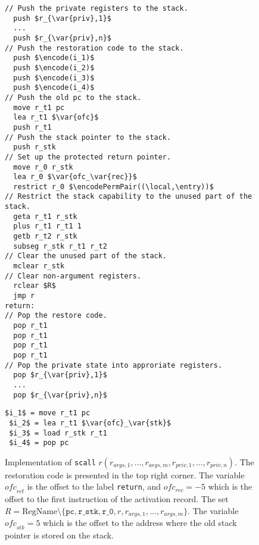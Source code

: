 \documentclass[format=acmsmall, review=true, screen=true]{acmart}
\newcommand{\var}[1]{\mathit{#1}}
\newcommand{\plainfun}[2]{
  \ifthenelse{\equal{#2}{}}
  {\mathit{#1}}
  {\mathit{#1}(#2)}
}
\newcommand{\encode}{\plainfun{encode}{}}
\newcommand{\encodePermPair}{\plainfun{encodePermPair}{}}
\newcommand{\plaindom}[1]{\mathrm{#1}}
\newcommand{\RegName}{\plaindom{RegName}}
\newcommand{\plainperm}[1]{\textsc{#1}}
\newcommand{\entry}{\plainperm{e}}
\newcommand{\plainlocality}[1]{\mathrm{#1}}
\newcommand{\local}{\plainlocality{local}}
\newenvironment{toplas}%
    {\color{OliveGreen}}{}
\begin{document}
\begin{toplas}
\begin{figure}[htb]
  \begin{toplas}
    \centering
    \begin{minipage}[t]{.6\linewidth}
\begin{lstlisting}
// Push the private registers to the stack.
  push $r_{\var{priv},1}$
  ...
  push $r_{\var{priv},n}$
// Push the restoration code to the stack.
  push $\encode(i_1)$
  push $\encode(i_2)$
  push $\encode(i_3)$
  push $\encode(i_4)$
// Push the old pc to the stack.
  move r_t1 pc
  lea r_t1 $\var{ofc}$ 
  push r_t1
// Push the stack pointer to the stack.
  push r_stk
// Set up the protected return pointer.
  move r_0 r_stk
  lea r_0 $\var{ofc_\var{rec}}$
  restrict r_0 $\encodePermPair((\local,\entry))$
// Restrict the stack capability to the unused part of the stack.
  geta r_t1 r_stk
  plus r_t1 r_t1 1
  getb r_t2 r_stk
  subseg r_stk r_t1 r_t2
// Clear the unused part of the stack.
  mclear r_stk
// Clear non-argument registers.
  rclear $R$
  jmp r
return:
// Pop the restore code.
  pop r_t1
  pop r_t1
  pop r_t1
  pop r_t1
// Pop the private state into approriate registers.
  pop $r_{\var{priv},1}$
  ...
  pop $r_{\var{priv},n}$
\end{lstlisting}      
    \end{minipage}
    \begin{minipage}[t]{.29\linewidth}
\begin{lstlisting}[title=\footnotesize{The restoration code used in \texttt{scall}.}, captionpos=b,xleftmargin=2em,frame=single,framexleftmargin=1.5em]
 $i_1$ = move r_t1 pc
 $i_2$ = lea r_t1 $\var{ofc}_\var{stk}$
 $i_3$ = load r_stk r_t1
 $i_4$ = pop pc
\end{lstlisting}
    \end{minipage}%
    \caption{Implementation of \texttt{scall} $r(r_{\var{args},1},\dots,
      r_{\var{args},m},r_{\var{priv},1},\dots, r_{\var{priv},n})$. The
      restoration code is presented in the top right corner. The
      variable $\var{ofc}_\var{ret}$ is the offset to the label \texttt{return}, and
      $\var{ofc_\var{rec}} = -5$ which is the offset to the first instruction of
      the activation record. The set $R = \RegName \setminus
      \{\texttt{pc},\texttt{r\_stk},\texttt{r\_0},r,r_{\var{args},1},\dots,r_{\var{args},m}\}$.
    The variable $\var{ofc}_\var{stk} =5$ which is the offset to the address
    where the old stack pointer is stored on the stack.}
    \label{fig:scall-impl}
  \end{toplas}
\end{figure}


\end{toplas}
\end{document}
